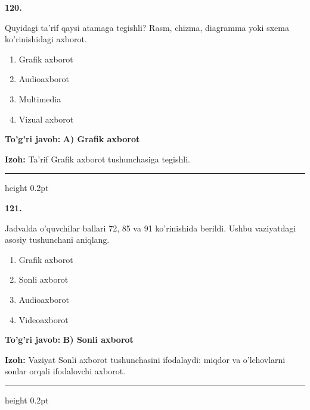\documentclass[10pt,a4paper,oneside]{article}
\begin{document}
\noindent\textbf{\color{ink}120.}
\par
Quyidagi ta'rif qaysi atamaga tegishli? Rasm, chizma, diagramma yoki sxema ko'rinishidagi axborot.
\begin{enumerate}[label=\Alph*),leftmargin=9mm]
\item Grafik axborot
\item Audioaxborot
\item Multimedia
\item Vizual axborot
\end{enumerate}
\begin{tcolorbox}[enhanced,breakable,colback=teal!4,colframe=teal!50!black,boxrule=0.5pt,arc=1.1mm,left=3mm,right=3mm,top=1.7mm,bottom=1.7mm,before skip=2mm,after skip=2mm]
\textbf{\color{teal}To'g'ri javob:} \textbf{A) Grafik axborot}
\par\smallskip
\textbf{Izoh:} Ta'rif Grafik axborot tushunchasiga tegishli.
\end{tcolorbox}
\vspace{2mm}\hrule height 0.2pt \vspace{3mm}

\noindent\textbf{\color{ink}121.}
\par
Jadvalda o'quvchilar ballari 72, 85 va 91 ko'rinishida berildi. Ushbu vaziyatdagi asosiy tushunchani aniqlang.
\begin{enumerate}[label=\Alph*),leftmargin=9mm]
\item Grafik axborot
\item Sonli axborot
\item Audioaxborot
\item Videoaxborot
\end{enumerate}
\begin{tcolorbox}[enhanced,breakable,colback=teal!4,colframe=teal!50!black,boxrule=0.5pt,arc=1.1mm,left=3mm,right=3mm,top=1.7mm,bottom=1.7mm,before skip=2mm,after skip=2mm]
\textbf{\color{teal}To'g'ri javob:} \textbf{B) Sonli axborot}
\par\smallskip
\textbf{Izoh:} Vaziyat Sonli axborot tushunchasini ifodalaydi: miqdor va o'lchovlarni sonlar orqali ifodalovchi axborot.
\end{tcolorbox}
\vspace{2mm}\hrule height 0.2pt \vspace{3mm}
\end{document}
